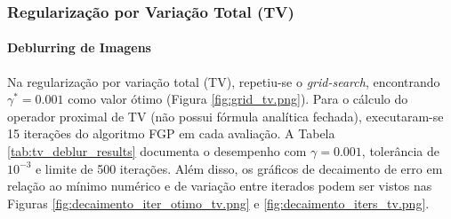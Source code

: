 \documentclass[12pt]{article}
\begin{document}
\begin{table}[H]
    \centering
    \caption{Métricas de Tempo ao PSNR Máximo nos Cenários Variáveis de Tomografia}
    \label{tab:exp_adicionais_psnr}
\end{table}

\subsubsection{Regularização por Variação Total (TV)}

\paragraph{Deblurring de Imagens}
Na regularização por variação total (TV), repetiu-se o \textit{grid-search}, encontrando $\gamma^* = 0.001$ como valor ótimo (Figura \ref{fig:grid_tv.png}). Para o cálculo do operador proximal de TV (não possui fórmula analítica fechada), executaram-se 15 iterações do algoritmo FGP em cada avaliação. A Tabela \ref{tab:tv_deblur_results} documenta o desempenho com $\gamma=0.001$, tolerância de $10^{-3}$ e limite de 500 iterações.
Além disso, os gráficos de decaimento de erro em relação ao mínimo numérico e de variação entre iterados podem ser vistos nas Figuras \ref{fig:decaimento_iter_otimo_tv.png} e \ref{fig:decaimento_iters_tv.png}.
\end{document}
